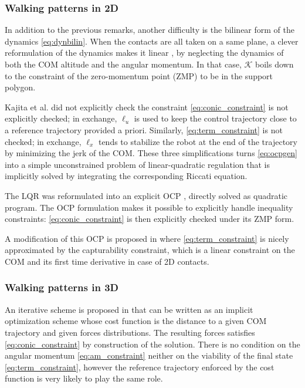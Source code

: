 \subsubsection{Walking patterns in 2D}
In addition to the previous remarks, another difficulty is the bilinear form of the dynamics \eqref{eq:dynbilin}.
When the contacts are all taken on a same plane, a clever reformulation of the dynamics makes it linear \cite{Kajita:icra:2003}, by neglecting the dynamics of both the COM altitude and the angular momentum. In that case, $\mathcal{K}$ boils down to the constraint of the zero-momentum point (ZMP) to be in the support polygon.

Kajita et al. \cite{Kajita:icra:2003} did not explicitly check the constraint \eqref{eq:conic_constraint} is not explicitly checked; in exchange, $\ell_u$ is used to keep the control trajectory close to a reference trajectory provided a priori. Similarly, \eqref{eq:term_constraint} is not checked; in exchange, $\ell_x$ tends to stabilize the robot at the end of the trajectory by minimizing the jerk of the COM. These three simplifications turns \eqref{eq:ocpgen} into a simple unconstrained problem of linear-quadratic regulation that is implicitly solved by integrating the corresponding Riccati equation.

The LQR was reformulated into an explicit OCP \cite{herdt:ar:2010}, directly solved as quadratic program. The OCP formulation makes it possible to explicitly handle inequality constraints: \eqref{eq:conic_constraint} is then explicitly checked under its ZMP form.

A modification of this OCP is proposed in \cite{Sherikov:ichr:2014} where \eqref{eq:term_constraint} is nicely approximated by the capturability constraint, which is a linear constraint on the COM and its first time derivative in case of 2D contacts.


\subsubsection{Walking patterns in 3D}
An iterative scheme is proposed in \cite{Hirukawa:icra:2007} that can be written as an implicit optimization scheme whose cost function is the distance to a given COM trajectory and given forces distributions. The resulting forces satisfies \eqref{eq:conic_constraint} by construction of the solution. There is no condition on the angular momentum \eqref{eq:am_constraint} neither on the viability of the final state \eqref{eq:term_constraint}, however the reference trajectory enforced by the cost function is very likely to play the same role.

